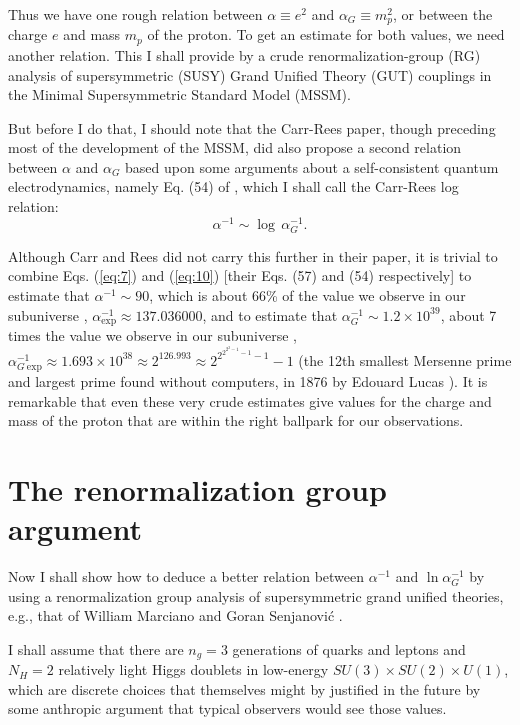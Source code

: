 \documentclass[a4paper,12pt]{article}
\begin{document}
	Thus we have one rough relation
between $\alpha \equiv e^2$ and $\alpha_G \equiv m_p^2$,
or between the charge $e$ and mass $m_p$ of the proton.
To get an estimate for both values, we need another relation.
This I shall provide by a crude renormalization-group (RG)
analysis of supersymmetric (SUSY)
Grand Unified Theory (GUT) couplings
in the Minimal Supersymmetric Standard Model (MSSM).

	But before I do that, I should note that the Carr-Rees
paper, though preceding most of the development of the MSSM,
did also propose a second relation between $\alpha$
and $\alpha_G$ based upon some arguments about
a self-consistent quantum electrodynamics, namely Eq. (54)
of \cite{Carr-Rees}, which I shall call the Carr-Rees log relation:
 \begin{equation}
 \alpha^{-1} \sim \log \, \alpha_G^{-1}.
 \label{eq:10}
 \end{equation}

	Although Carr and Rees did not carry this further
in their paper, it is trivial to combine Eqs. (\ref{eq:7})
and (\ref{eq:10}) [their Eqs. (57) and (54) respectively]
to estimate that $\alpha^{-1} \sim 90$, which is about 66\%
of the value we observe in our subuniverse \cite{PDG},
$\alpha_{\mathrm{exp}}^{-1} \approx 137.036000$,
and to estimate that $\alpha_G^{-1} \sim 1.2 \times 10^{39}$,
about 7 times the value we observe in our subuniverse \cite{PDG},
$\alpha_{G\ \mathrm{exp}}^{-1} \approx 1.693 \times 10^{38}
 \approx 2^{126.993} \approx 2^{2^{2^{2^2-1}-1}-1}-1$
(the 12th smallest Mersenne prime and largest prime found
without computers, in 1876 by Edouard Lucas \cite{Lucas}).
It is remarkable that even these very crude estimates
give values for the charge and mass of the proton that
are within the right ballpark for our observations.

\section{The renormalization group argument}

	Now I shall show how to deduce a better relation
between $\alpha^{-1}$ and $\ln \alpha_G^{-1}$
by using a renormalization group analysis of
supersymmetric grand unified theories, e.g.,
that of William Marciano and Goran Senjanovi\'c \cite{MarCen}.

	I shall assume that there are $n_g = 3$ generations
of quarks and leptons and $N_H = 2$ relatively light Higgs doublets
in low-energy $SU(3)\times SU(2)\times U(1)$,
which are discrete choices that themselves might by justified
in the future by some anthropic argument that typical observers
would see those values.
\end{document}
